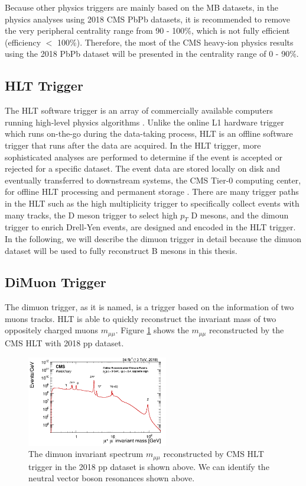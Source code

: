 Because other physics triggers are mainly based on the MB datasets, in the physics analyses using 2018 CMS PbPb datasets, it is recommended to remove the very peripheral centrality range from 90 - 100\%, which is not fully efficient (efficiency $<$ 100\%). Therefore, the most of the CMS heavy-ion physics results using the 2018 PbPb dataset will be presented in the centrality range of 0 - 90\%.

\subsection{HLT Trigger}

The HLT software trigger is an array of commercially available computers running high-level physics algorithms \cite{CMSTrigger}. Unlike the online L1 hardware trigger which runs on-the-go during the data-taking process, HLT is an offline software trigger that runs after the data are acquired. In the HLT trigger, more sophisticated analyses are performed to determine if the event is accepted or rejected for a specific dataset. The event data are stored locally on disk and eventually transferred to downstream systems, the CMS Tier-0 computing center, for offline HLT processing and permanent storage \cite{CMSTrigger}. There are many trigger paths in the HLT such as the high multiplicity trigger to specifically collect events with many tracks, the D meson trigger to select high $p_T$ D mesons, and the dimoun trigger to enrich Drell-Yen events, are designed and encoded in the HLT trigger. In the following, we will describe the dimuon trigger in detail because the dimuon dataset will be used to fully reconstruct B mesons in this thesis. 

\subsection{DiMuon Trigger}

The dimuon trigger, as it is named, is a trigger based on the information of two muons tracks. HLT is able to quickly reconstruct the invariant mass of two oppositely charged muons $m_{\mu\mu}$. Figure \ref{DimuonInvMass} shows the $m_{\mu\mu}$ reconstructed by the CMS HLT with 2018 pp dataset.

\begin{figure}[hbtp]
\begin{center}
\includegraphics[width=0.55\textwidth]{Figures/Chapter3/DimuonInvMass.png}
\caption{The dimuon invariant spectrum $m_{\mu\mu}$ reconstructed by CMS HLT trigger in the 2018 pp dataset is shown above. We can identify the neutral vector boson resonances shown above.}
\label{DimuonInvMass}
\end{center}
\end{figure} 


